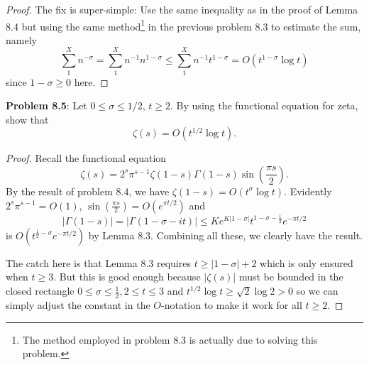 \documentclass[12pt]{article}
\begin{document}
\begin{proof}
The fix is super-simple: Use the same inequality as in the proof of Lemma 8.4 but using the same method\footnote{The method employed in problem 8.3 is actually due to solving this problem.} in the previous problem 8.3 to estimate the sum, namely
$$\sum_1^X n^{-\sigma} = \sum_1^X n^{-1} n^{1-\sigma} \leq \sum_1^X n^{-1} t^{1-\sigma} = O(t^{1-\sigma} \log t)$$
since $1 - \sigma \geq 0$ here.
\end{proof}

\textbf{Problem 8.5}: Let $0 \leq \sigma \leq 1/2$, $t \geq 2$. By using the functional equation for zeta, show that
$$\zeta(s) = O(t^{1/2} \log t).$$

\begin{proof}
Recall the functional equation
$$\zeta(s) = 2^s \pi^{s - 1} \zeta(1 - s) \Gamma(1-s) \sin\left( \frac{\pi s}{2}\right).$$
By the result of problem 8.4, we have $\zeta(1 - s) = O(t^\sigma \log t)$. Evidently $2^s \pi^{s - 1} = O(1)$, $\sin\left( \frac{\pi s}{2}\right) = O(e^{\pi t / 2})$ and
$$|\Gamma(1-s)| = |\Gamma(1 - \sigma - it)| \leq K e^{K|1 - \sigma|} t^{1 - \sigma - \frac12} e^{-\pi t/ 2}$$
is $O(t^{\frac12 - \sigma} e^{-\pi t/ 2})$ by Lemma 8.3. Combining all these, we clearly have the result.

The catch here is that Lemma 8.3 requires $t \geq |1 - \sigma| + 2$ which is only ensured when $t \geq 3$. But this is good enough because $|\zeta(s)|$ must be bounded in the closed rectangle $0 \leq \sigma \leq \frac12, 2 \leq t \leq 3$ and $t^{1/2} \log t \geq \sqrt{2} \log 2 > 0$ so we can simply adjust the constant in the $O$-notation to make it work for all $t \geq 2$.
\end{proof}

\unless\ifdefined\IsMainDocument
\end{document}
